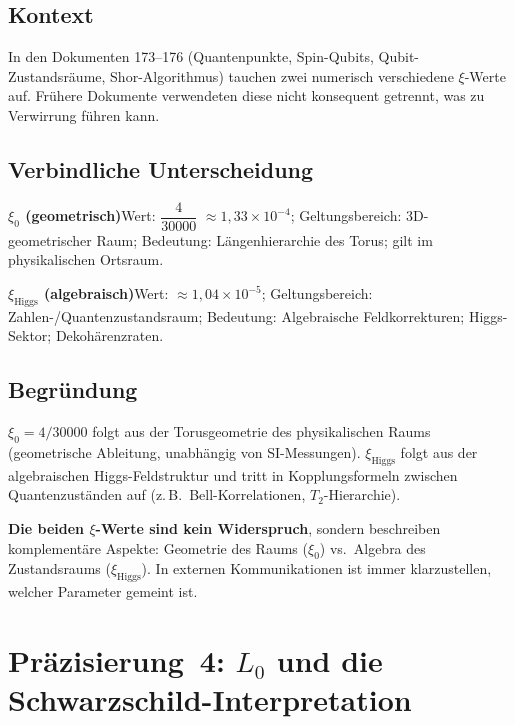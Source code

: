\subsection*{Kontext}

In den Dokumenten 173--176 (Quantenpunkte, Spin-Qubits, Qubit-Zustandsräume,
Shor-Algorithmus) tauchen zwei numerisch verschiedene $\xi$-Werte auf.
Frühere Dokumente verwendeten diese nicht konsequent getrennt, was zu
Verwirrung führen kann.

\subsection*{Verbindliche Unterscheidung}

\smallskip\noindent \textbf{$\xi_0$ (geometrisch)}\quad Wert: $\dfrac{4}{30000}$ $\approx 1{,}33 \times 10^{-4}$; Geltungsbereich: 3D-geometrischer Raum; Bedeutung: Längenhierarchie des Torus; gilt im physikalischen Ortsraum.

\smallskip\noindent \textbf{$\xi_{\text{Higgs}}$ (algebraisch)}\quad Wert: $\approx 1{,}04 \times 10^{-5}$; Geltungsbereich: Zahlen-/Quantenzustandsraum; Bedeutung: Algebraische Feldkorrekturen; Higgs-Sektor; Dekohärenzraten.

\medskip


\subsection*{Begründung}

$\xi_0 = 4/30000$ folgt aus der Torusgeometrie des physikalischen Raums
(geometrische Ableitung, unabhängig von SI-Messungen). $\xi_{\text{Higgs}}$
folgt aus der algebraischen Higgs-Feldstruktur und tritt in Kopplungsformeln
zwischen Quantenzuständen auf (z.\,B.\ Bell-Korrelationen, $T_2$-Hierarchie).

\textbf{Die beiden $\xi$-Werte sind kein Widerspruch}, sondern beschreiben
komplementäre Aspekte: Geometrie des Raums ($\xi_0$) vs.\ Algebra des
Zustandsraums ($\xi_{\text{Higgs}}$). In externen Kommunikationen ist immer
klarzustellen, welcher Parameter gemeint ist.

\section{\texorpdfstring{Präzisierung~4: $L_0$ und die Schwarzschild-Interpretation}{Praezisierung 4: L0 und die Schwarzschild-Interpretation}}

